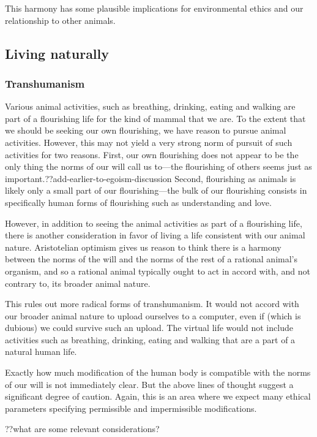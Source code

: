 This harmony has some plausible implications for environmental ethics and our relationship to other animals. 

\subsection{Living naturally}
\subsubsection{Transhumanism}
Various animal activities, such as breathing, drinking, eating and walking are part of a flourishing life for the kind of mammal 
that we are. To the extent that we should be seeking our own flourishing, we have reason to pursue animal activities. However,
this may not yield a very strong norm of pursuit of such activities for two reasons. First, our own flourishing does not appear
to be the only thing the norms of our will call us to---the flourishing of others seems just as important.??add-earlier-to-egoism-discussion
Second, flourishing as animals is likely only a small part of our flourishing---the bulk of our flourishing consists in specifically
human forms of flourishing such as understanding and love. 

However, in addition to seeing the animal activities as part of a flourishing life, there is another consideration in favor of 
living a life consistent with our animal nature. Aristotelian optimism gives us reason to think there is a harmony between 
the norms of the will and the norms of the rest of a rational animal's organism, and so a rational animal typically ought to act in 
accord with, and not contrary to, its broader animal nature. 

This rules out more radical forms of transhumanism. It would not accord with our broader animal nature to upload ourselves to a computer,
even if (which is dubious) we could survive such an upload. The virtual life would not include 
activities such as breathing, drinking, eating and walking that are a part of a natural human life.

Exactly how much modification of the human body is compatible with the norms of our will is not immediately clear. But the above
lines of thought suggest a significant degree of caution. Again, this is an area where we expect many ethical parameters specifying
permissible and impermissible modifications.

??what are some relevant considerations?

